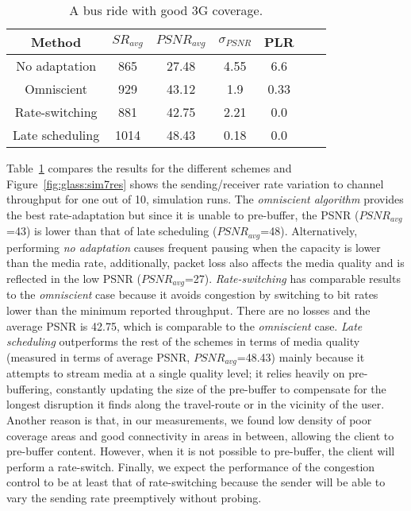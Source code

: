\begin{table}
  \begin{center}
\begin{tabular}{ccccccc} \hline
Method & $SR_{avg}$ & $PSNR_{avg}$ & $\sigma_{PSNR}$ & PLR \\ \hline
No adaptation   & 865   & 27.48 & 4.55  & 6.6 \\
Omniscient      & 929   & 43.12 & 1.9   & 0.33 \\ 
Rate-switching  & 881   & 42.75 & 2.21  & 0.0  \\ 
Late scheduling & 1014  & 48.43 & 0.18 & 0.0  \\ \hline
\end{tabular}
\caption{A bus ride with good 3G coverage.}
\label{table-glass-sim7res}
\end{center}
\end{table}


Table~\ref{table-glass-sim7res} compares the results for the different schemes
and Figure~\ref{fig:glass:sim7res} shows the sending/receiver rate variation
to channel throughput for one out of 10, simulation runs. The \emph{omniscient
algorithm} provides the best rate-adaptation but since it is unable to 
pre-buffer, the PSNR ($PSNR_{avg}$=43) is lower than that of late scheduling
($PSNR_{avg}$=48). Alternatively, performing \emph{no adaptation} causes
frequent pausing when the capacity is lower than the media rate, additionally,
packet loss also affects the media quality and is reflected in the low PSNR
($PSNR_{avg}$=27). \emph{Rate-switching} has comparable results to the
\emph{omniscient} case because it avoids congestion by switching to bit rates
lower than the minimum reported throughput. There are no losses and the average
PSNR is 42.75, which is comparable to the \emph{omniscient} case. \emph{Late
scheduling} outperforms the rest of the schemes in terms of media quality
(measured in terms of average PSNR, $PSNR_{avg}$=48.43) mainly because it
attempts to stream media at a single quality level; it relies heavily on 
pre-buffering, constantly updating the size of the pre-buffer to compensate for
the longest disruption it finds along the travel-route or in the vicinity of
the user. Another reason is that, in our measurements, we found low density of
poor coverage areas and good connectivity in areas in between, allowing the
client to pre-buffer content. However, when it is not possible to pre-buffer,
the client will perform a rate-switch. Finally, we expect the performance of
the congestion control to be at least that of rate-switching because the
sender will be able to vary the sending rate preemptively without probing.

